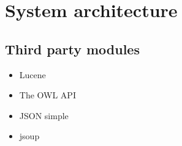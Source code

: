 \chapter{System architecture}
\label{cha:architecture}

\section{Third party modules}
\label{sec:third-party-modules}

\begin{itemize}
\item Lucene\cite{software:lucene}
\item The OWL API\cite{software:owl-api}
\item JSON simple\cite{software:json-simple}
\item jsoup\cite{software:jsoup}
\end{itemize}
